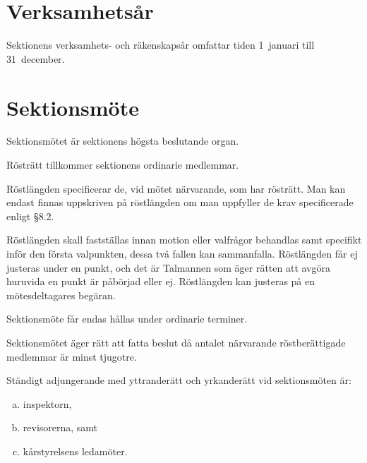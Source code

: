 \documentclass[stadgar]{dsekprotokoll}
\begin{document}
\section{Verksamhetsår}

\begin{stadgeavsnitt}


Sektionens verksamhets- och räkenskapsår omfattar tiden 1~januari till
31~december.

\end{stadgeavsnitt}

\section{Sektionsmöte}

\begin{stadgeavsnitt}


Sektionsmötet är sektionens högsta beslutande organ.


Rösträtt tillkommer sektionens ordinarie medlemmar.


Röstlängden specificerar de, vid mötet närvarande, som har rösträtt. Man kan endast finnas uppskriven på röstlängden om man uppfyller de krav specificerade enligt §8.2.

Röstlängden skall fastställas innan motion eller valfrågor behandlas samt specifikt inför den första valpunkten, dessa två fallen kan sammanfalla. Röstlängden får ej justeras under en punkt, och det är Talmannen som äger rätten att avgöra huruvida en punkt är påbörjad eller ej. Röstlängden kan justeras på en mötesdeltagares begäran.

Sektionsmöte får endas hållas under ordinarie terminer.


Sektionsmötet äger rätt att fatta beslut då antalet närvarande
röstberättigade medlemmar är minst tjugotre.


Ständigt adjungerande med yttranderätt och yrkanderätt vid sektionsmöten
är:
\begin{enumerate}[a)]
\item inspektorn,
\item revisorerna, samt
\item kårstyrelsens ledamöter.
\end{enumerate}


\end{stadgeavsnitt}
\end{document}
